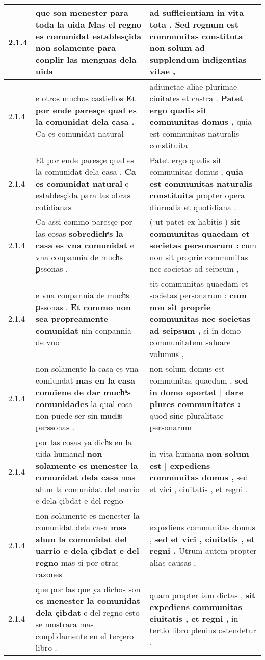 \begin{tabular}{|p{1cm}|p{6.5cm}|p{6.5cm}|}
2.1.4 & que son menester para toda la uida \textbf{ Mas el regno es comunidat establesçida } non solamente para conplir las menguas dela uida & ad sufficientiam in vita tota . \textbf{ Sed regnum est communitas constituta } non solum ad supplendum indigentias vitae , \\\hline
2.1.4 & e otros muchos castiellos \textbf{ Et por ende paresçe qual es la comunidat dela casa . } Ca es comunidat natural & adiunctae aliae plurimae ciuitates et castra . \textbf{ Patet ergo qualis sit communitas domus , } quia est communitas naturalis constituita \\\hline
2.1.4 & Et por ende paresçe qual es la comunidat dela casa . \textbf{ Ca es comunidat natural } e establesçida para las obras cotidianas & Patet ergo qualis sit communitas domus , \textbf{ quia est communitas naturalis constituita } propter opera diurnalia et quotidiana . \\\hline
2.1.4 & Ca assi commo paresçe por las cosas \textbf{ sobredichͣs la casa es vna comunidat } e vna conpannia de muchͣs ꝑssonas . & ( ut patet ex habitis ) \textbf{ sit communitas quaedam et societas personarum : } cum non sit proprie communitas nec societas ad seipsum , \\\hline
2.1.4 & e vna conpannia de muchͣs ꝑssonas . \textbf{ Et commo non sea propreamente comunidat } nin conpannia de vno & sit communitas quaedam et societas personarum : \textbf{ cum non sit proprie communitas nec societas ad seipsum , } si in domo communitatem saluare volumus , \\\hline
2.1.4 & non solamente la casa es vna comiundat \textbf{ mas en la casa conuiene de dar muchͣs comunidades } la qual cosa non puede ser sin muchͣs perssonas . & non solum domus est communitas quaedam , \textbf{ sed in domo oportet | dare plures communitates : } quod sine pluralitate personarum \\\hline
2.1.4 & por las cosas ya dichͣs en la uida humanal \textbf{ non solamente es menester la comunidat dela casa } mas ahun la comunidat del uarrio e dela çibdat e del regno & in vita humana \textbf{ non solum est | expediens communitas domus , } sed et vici , ciuitatis , et regni . \\\hline
2.1.4 & non solamente es menester la comunidat dela casa \textbf{ mas ahun la comunidat del uarrio e dela çibdat e del regno } mas si por otras razones & expediens communitas domus , \textbf{ sed et vici , ciuitatis , et regni . } Utrum autem propter alias causas , \\\hline
2.1.4 & que por las que ya dichos son \textbf{ es menester la comunidat dela çibdat } e del regno esto se mostrara mas conplidamente en el terçero libro . & quam propter iam dictas , \textbf{ sit expediens communitas ciuitatis , et regni , } in tertio libro plenius ostendetur . \\\hline

\end{tabular}
